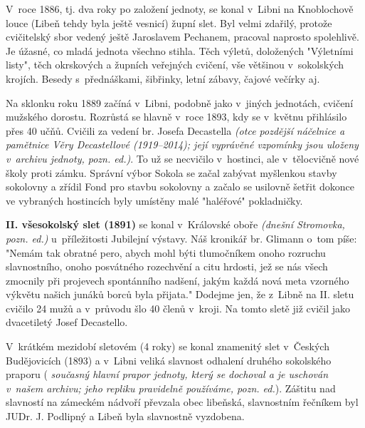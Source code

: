 \documentclass[a5paper, 12pt, twoside]{article}
\newcommand{\pozned}[1]{%
\textit{#1}}
\begin{document}
V~roce 1886, tj. dva roky po založení jednoty, se konal v~Libni na Knoblochově louce (Libeň tehdy byla ještě vesnicí) župní slet. Byl velmi zdařilý, protože cvičitelský sbor vedený ještě Jaroslavem Pechanem, pracoval naprosto spolehlivě. Je úžasné, co mladá jednota všechno stihla. Těch výletů, doložených "Výletními listy", těch okrskových a župních veřejných cvičení, vše většinou v~sokolských krojích. Besedy s~přednáškami, šibřinky, letní zábavy, čajové večírky aj.


Na sklonku roku 1889 začíná v~Libni, podobně jako v~jiných jednotách, cvičení mužského dorostu. Rozrůstá se hlavně v~roce 1893, kdy se v~květnu přihlásilo přes 40 učňů. Cvičili za vedení br. Josefa Decastella \pozned{(otce pozdější náčelnice a pamětnice Věry Decastellové (1919–2014); její vyprávěné vzpomínky jsou uloženy v~archivu jednoty, pozn. ed.)}. To už se necvičilo v~hostinci, ale v~tělocvičně nové školy proti zámku. Správní výbor Sokola se začal zabývat myšlenkou stavby sokolovny a zřídil Fond pro stavbu sokolovny a začalo se usilovně šetřit dokonce ve vybraných hostincích byly umístěny malé "haléřové" pokladničky.

\textbf{II. všesokolský slet (1891)} se konal v~Královské oboře \pozned{(dnešní Stromovka, pozn. ed.)} u~příležitosti Jubilejní výstavy. Náš kronikář br. Glimann o~tom píše: "Nemám tak obratné pero, abych mohl býti tlumočníkem onoho rozruchu slavnostního, onoho posvátného rozechvění a citu hrdosti, jež se nás všech zmocnily při projevech spontánního nadšení, jakým každá nová meta vzorného výkvětu našich junáků borců byla přijata." Dodejme jen, že z~Libně na II. sletu cvičilo 24 mužů a v~průvodu šlo 40 členů v~kroji. Na tomto sletě již cvičil jako dvacetiletý Josef Decastello.

V~krátkém mezidobí sletovém (4 roky) se konal znamenitý slet v~Českých Budějovicích (1893) a v~Libni veliká slavnost odhalení druhého sokolského praporu (\pozned{současný hlavní prapor jednoty, který se dochoval a je uschován v~našem archivu; jeho repliku pravidelně používáme, pozn. ed.}). Záštitu nad slavností na zámeckém nádvoří převzala obec libeňská, slavnostním řečníkem byl JUDr. J. Podlipný a Libeň byla slavnostně vyzdobena.

\end{document}
